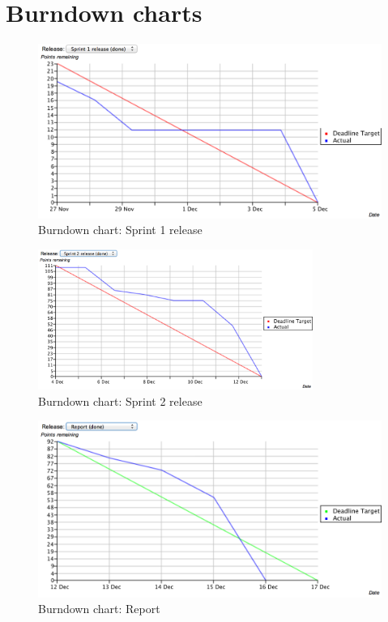 \section{Burndown charts}
\label{sec:burndown-charts}

\begin{figure}[htb]
	\centering
	\includegraphics[width=1\textwidth]{Appendices/graphics/burndown_1.png}
	\caption{Burndown chart: Sprint 1 release}
	\label{fig:burndown-chart-1}
\end{figure}

\begin{figure}[htb]
	\centering
	\includegraphics[width=0.8\textwidth]{Appendices/graphics/burndown_2.png}
	\caption{Burndown chart: Sprint 2 release}
	\label{fig:burndown-chart-2}
\end{figure}

\begin{figure}[htb]
	\centering
	\includegraphics[width=1\textwidth]{Appendices/graphics/burndown_3.png}
	\caption{Burndown chart: Report}
	\label{fig:burndown-chart-3}
\end{figure}